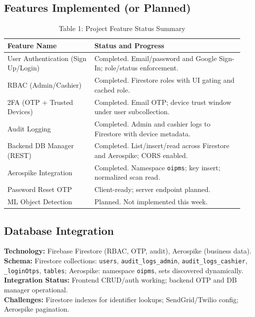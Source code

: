 \documentclass[12pt]{article}
\begin{document}
\subsection{Features Implemented (or Planned)}
\begingroup\small\setlength{\tabcolsep}{6pt}
\begin{longtable}{p{0.35\linewidth} p{0.6\linewidth}}
\caption{Table 1: Project Feature Status Summary}\\
\toprule
\textbf{Feature Name} & \textbf{Status and Progress} \\
\midrule
User Authentication (Sign Up/Login) & Completed. Email/password and Google Sign-In; role/status enforcement. \\
RBAC (Admin/Cashier) & Completed. Firestore roles with UI gating and cached role. \\
2FA (OTP + Trusted Devices) & Completed. Email OTP; device trust window under user subcollection. \\
Audit Logging & Completed. Admin and cashier logs to Firestore with device metadata. \\
Backend DB Manager (REST) & Completed. List/insert/read across Firestore and Aerospike; CORS enabled. \\
Aerospike Integration & Completed. Namespace \texttt{oipms}; key insert; normalized scan read. \\
Password Reset OTP & Client-ready; server endpoint planned. \\
ML Object Detection & Planned. Not implemented this week. \\
\bottomrule
\end{longtable}
\endgroup

\subsection{Database Integration}
\textbf{Technology:} Firebase Firestore (RBAC, OTP, audit), Aerospike (business data).\\
\textbf{Schema:} Firestore collections: \texttt{users}, \texttt{audit\_logs\_admin}, \texttt{audit\_logs\_cashier}, \texttt{\_loginOtps}, \texttt{tables}; Aerospike: namespace \texttt{oipms}, sets discovered dynamically.\\
\textbf{Integration Status:} Frontend CRUD/auth working; backend OTP and DB manager operational.\\
\textbf{Challenges:} Firestore indexes for identifier lookups; SendGrid/Twilio config; Aerospike pagination.
\end{document}
